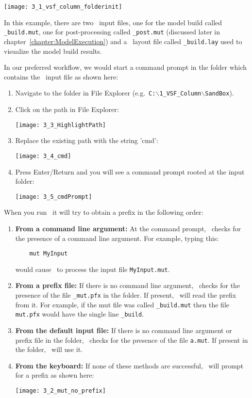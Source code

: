     \texttt{[image: 3\_1\_vsf\_column\_folderinit]}

In this example, there are two \mut\ input files, one for the model build called \texttt{\_build.mut}, one for post-processing called \texttt{\_post.mut} (discussed later in chapter~\ref{chapter:ModelExecution}) and a \tecplot\ layout file called \texttt{\_build.lay} used to visualize the model build results.


 In our preferred workflow, we would start a command prompt in the folder which contains the \mut\ input file as shown here:
\begin{enumerate}
    \item  Navigate to the folder in File Explorer (e.g.\ \texttt{C:$\backslash$1\_VSF\_Column\-$\backslash$SandBox}).
   \item  Click on the path in File Explorer:

        \texttt{[image: 3\_3\_HighlightPath]}

    \item  Replace the existing path with the string 'cmd':

        \texttt{[image: 3\_4\_cmd]}

    \item Press Enter/Return and you will see a command prompt rooted at the input folder:

        \texttt{[image: 3\_5\_cmdPrompt]}

\end{enumerate}


When you run \mut\, it will try to obtain a prefix in the following order:
\begin{enumerate}
    \item \textbf{From a command line argument:} \label{commarg} At the command prompt, \mut\ checks for the presence of a command line argument.  For example, typing this:
\begin{verbatim}
    mut MyInput
\end{verbatim}
        would cause \mut\ to process the input file \texttt{MyInput.mut}.  
    \item \textbf{From a prefix file:} If there is no command line argument, \mut\ checks for the presence of the file \texttt{\_mut.pfx} in the folder.  If present, \mut\ will read the prefix from it. For example, if the mut file was called \texttt{\_build.mut} then the file \texttt{mut.pfx} would have the single line \texttt{\_build}.
    \item \textbf{From the default input file:} If there is no command line argument or prefix file in the folder, \mut\ checks for the presence of the file \texttt{a.mut}.  If present in the folder, \mut\ will use it.
    \item \textbf{From the keyboard:} If none of these methods are successful, \mut\ will prompt for a prefix as shown here:

        \texttt{[image: 3\_2\_mut\_no\_prefix]}

\end{enumerate}

